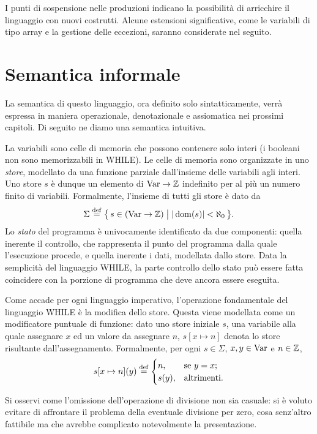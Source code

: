 I punti di sospensione nelle produzioni indicano la possibilità di
arricchire il linguaggio con nuovi costrutti.  Alcune estensioni
significative, come le variabili di tipo array e la gestione
delle eccezioni, saranno considerate nel seguito.


\section{Semantica informale}

La semantica di questo linguaggio, ora definito solo sintatticamente,
verrà espressa in maniera operazionale, denotazionale e assiomatica
nei prossimi capitoli. Di seguito ne diamo una semantica
intuitiva.

La variabili sono celle di memoria che possono contenere solo interi
(i booleani non sono memorizzabili in WHILE).
Le celle di memoria sono organizzate in uno \emph{store},
modellato da una funzione parziale dall'insieme delle variabili
agli interi.  Uno store $s$ è dunque un elemento di $\mathrm{Var} \rightarrow \mathbb{Z}$
indefinito per al più un numero finito di variabili.
Formalmente, l'insieme di tutti gli store è dato da
\[
  \Sigma \defeq \bigl\{\,
                  s \in (\Var \rightarrow \Zset)
                \bigm|
                  |\dom(s)| < \aleph_0
                \,\bigr\}.
\]
Lo \emph{stato} del programma è univocamente identificato da due componenti:
quella inerente il controllo, che rappresenta il punto del programma
dalla quale l'esecuzione procede, e quella inerente i dati, modellata
dallo store.  Data la semplicità del linguaggio WHILE, la parte controllo
dello stato può essere fatta coincidere con la porzione di programma
che deve ancora essere eseguita.

Come accade per ogni linguaggio imperativo, l'operazione fondamentale
del linguaggio WHILE è la modifica dello store.  Questa viene modellata
come un modificatore puntuale di funzione: dato uno store iniziale $s$,
una variabile alla quale assegnare $x$ ed un valore da assegnare $n$,
$s[x \mapsto n]$ denota lo store risultante dall'assegnamento.
Formalmente, per ogni $s \in \Sigma$, $x, y \in \mathrm{Var}$ e $n \in \mathbb{Z}$,
\[
  s[x \mapsto n](y)
    \defeq
      \begin{cases}
        n,    &\text{se $y = x$;} \\
        s(y), &\text{altrimenti.}
      \end{cases}
\]

Si osservi come l'omissione dell'operazione di divisione non sia casuale:
si è voluto evitare di affrontare il problema della eventuale divisione
per zero, cosa senz'altro fattibile ma che avrebbe complicato notevolmente
la presentazione.

